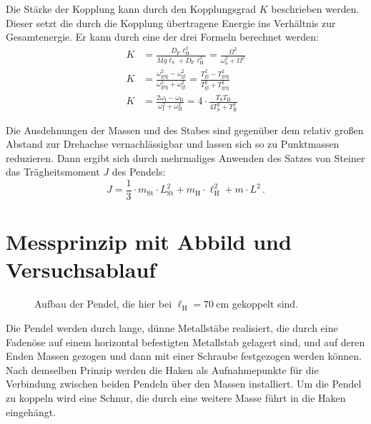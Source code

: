 \documentclass[12pt,a4paper]{scrartcl}
\newcommand{\lh}{\ell_{\mathrm{H}}}
\newcommand{\ls}{\ell_{\mathrm{S}}}
\begin{document}
Die Stärke der Kopplung kann durch den Kopplungsgrad \(K\) beschrieben werden. Dieser setzt die durch die Kopplung übertragene Energie ins Verhältnis zur Gesamtenergie. Er kann durch eine der drei Formeln berechnet werden:
\begin{align}
	K &= \frac{D_{\text{F}} \ell_{\text{H}}^2}{Mg \ls + D_{\text{F}} \ell_{\text{H}}^2} = \frac{\Omega^2}{\omega_0^2 + \Omega^2}\label{eq:1}\\
	K &= \frac{\omega_{\text{geg}}^2 - \omega_{\text{gl}}^2}{\omega_{\text{geg}}^2 + \omega_{\text{gl}}^2} = \frac{T_{\text{gl}}^2 - T_{\text{geg}}^2}{T_{\text{gl}}^2 + T_{\text{geg}}^2}\label{eq:2}\\
	K &= \frac{2\omega_{\text{I}} - \omega_{\text{II}}}{\omega_{\text{I}}^2 + \omega_{\text{II}}^2} = 4\cdot\frac{T_{\text{S}} T_{\text{II}}}{4T_{\text{S}}^2 + T_{\text{II}}^2} \label{eq:3}
\end{align}

Die Ausdehnungen der Massen und des Stabes sind gegenüber dem relativ großen Abstand zur Drehachse vernachlässigbar und lassen sich so zu Punktmassen reduzieren. Dann ergibt sich durch mehrmaliges Anwenden des Satzes von Steiner das Trägheitsmoment \(J\) des Pendels:
\begin{equation}\label{eq:trägheitsmom}
	J=\frac{1}{3} \cdot m_{\text{St}} \cdot L_{\text{St}}^2 + m_{\text{H}} \cdot \lh^2 + m \cdot L^2 \,.
\end{equation}

\section[Messprinzip]{Messprinzip mit Abbild und Versuchsablauf}

\begin{figure}[H]
	\caption{Aufbau der Pendel, die hier bei \(\lh = \qty{70}{\centi\meter}\) gekoppelt sind.}
	\label{fig:aufbau}
\end{figure}

Die Pendel werden durch lange, dünne Metallstäbe realisiert, die durch eine Fadenöse auf einem horizontal befestigten Metallstab gelagert sind, und auf deren Enden Massen gezogen und dann mit einer Schraube festgezogen werden können. Nach demselben Prinzip werden die Haken als Aufnahmepunkte für die Verbindung zwischen beiden Pendeln über den Massen installiert. Um die Pendel zu koppeln wird eine Schnur, die durch eine weitere Masse führt in die Haken eingehängt.
\end{document}
